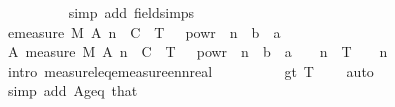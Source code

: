 \begin{isabellebody}
\ \ \ \ \ \ \ \ \isamarkupfalse%
\ {\isacharparenleft}{\kern0pt}simp\ add{\isacharcolon}{\kern0pt}\ field{\isacharunderscore}{\kern0pt}simps{\isacharparenright}{\kern0pt}\isanewline
\ \ \ \ \ \ \isamarkupfalse%
\ \isamarkupfalse%
\ {\isachardoublequoteopen}emeasure\ {\isacharquery}{\kern0pt}M\ {\isacharparenleft}{\kern0pt}A\ n{\isacharparenright}{\kern0pt}\ {\isasymle}\ C\ {\isacharasterisk}{\kern0pt}\ T\ {\isacharasterisk}{\kern0pt}\ {}\ powr\ {\isacharparenleft}{\kern0pt}{\isacharminus}{\kern0pt}\ n\ {\isacharasterisk}{\kern0pt}\ {\isacharparenleft}{\kern0pt}b\ {\isacharminus}{\kern0pt}\ a\ {\isacharasterisk}{\kern0pt}\ {\isasymgamma}{\isacharparenright}{\kern0pt}{\isacharparenright}{\kern0pt}{\isachardoublequoteclose}\ \isacommand{{\isachardot}{\kern0pt}}\isamarkupfalse%
\isanewline
\ \ \ \ \isamarkupfalse%
\isanewline
\ \ \ \ \isamarkupfalse%
\ \isamarkupfalse%
\ A{\isacharcolon}{\kern0pt}\ {\isachardoublequoteopen}measure\ {\isacharquery}{\kern0pt}M\ {\isacharparenleft}{\kern0pt}A\ n{\isacharparenright}{\kern0pt}\ {\isasymle}\ C\ {\isacharasterisk}{\kern0pt}\ T\ {\isacharasterisk}{\kern0pt}\ {}\ powr\ {\isacharparenleft}{\kern0pt}{\isacharminus}{\kern0pt}\ n\ {\isacharasterisk}{\kern0pt}\ {\isacharparenleft}{\kern0pt}b\ {\isacharminus}{\kern0pt}\ a\ {\isacharasterisk}{\kern0pt}\ {\isasymgamma}{\isacharparenright}{\kern0pt}{\isacharparenright}{\kern0pt}{\isachardoublequoteclose}\ \ {\isachardoublequoteopen}{}{\isacharcircum}{\kern0pt}n\ {\isacharasterisk}{\kern0pt}\ T\ {\isasymge}\ {}{\isachardoublequoteclose}\ \ n\isanewline
\ \ \ \ \ \ \isamarkupfalse%
\ {\isacharparenleft}{\kern0pt}intro\ measure{\isacharunderscore}{\kern0pt}leq{\isacharunderscore}{\kern0pt}emeasure{\isacharunderscore}{\kern0pt}ennreal{\isacharparenright}{\kern0pt}\isanewline
\ \ \ \ \ \ \ \ \isamarkupfalse%
\ gt{\isacharunderscore}{\kern0pt}{}{\isacharparenleft}{\kern0pt}{}{\isacharparenright}{\kern0pt}\ {\isacartoucheopen}T\ {\isachargreater}{\kern0pt}\ {}{\isacartoucheclose}\ \isamarkupfalse%
\ auto{\isacharbrackleft}{\kern0pt}{}{\isacharbrackright}{\kern0pt}\isanewline
\ \ \ \ \ \ \ \ \isamarkupfalse%
\ {\isacharparenleft}{\kern0pt}simp\ add{\isacharcolon}{\kern0pt}\ A{\isacharunderscore}{\kern0pt}geq\ that{\isacharparenright}{\kern0pt}\isanewline
\ \ \ \ \ \ \isamarkupfalse%

\end{isabellebody}

